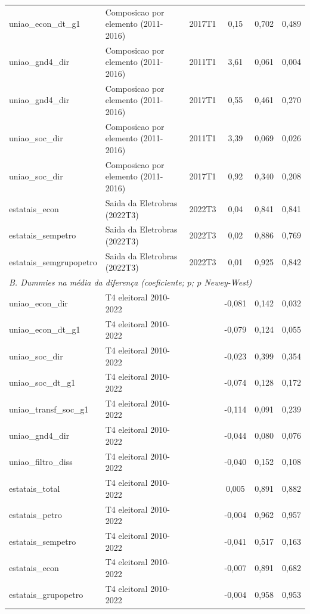 \begin{table}[htbp]
\begin{tabular}{lllccc}
uniao\_econ\_dt\_g1 & Composicao por elemento (2011-2016) & 2017T1 & 0{,}15 & 0{,}702 & 0{,}489 \\
uniao\_gnd4\_dir & Composicao por elemento (2011-2016) & 2011T1 & 3{,}61 & 0{,}061 & 0{,}004 \\
uniao\_gnd4\_dir & Composicao por elemento (2011-2016) & 2017T1 & 0{,}55 & 0{,}461 & 0{,}270 \\
uniao\_soc\_dir & Composicao por elemento (2011-2016) & 2011T1 & 3{,}39 & 0{,}069 & 0{,}026 \\
uniao\_soc\_dir & Composicao por elemento (2011-2016) & 2017T1 & 0{,}92 & 0{,}340 & 0{,}208 \\
estatais\_econ & Saida da Eletrobras (2022T3) & 2022T3 & 0{,}04 & 0{,}841 & 0{,}841 \\
estatais\_sempetro & Saida da Eletrobras (2022T3) & 2022T3 & 0{,}02 & 0{,}886 & 0{,}769 \\
estatais\_semgrupopetro & Saida da Eletrobras (2022T3) & 2022T3 & 0{,}01 & 0{,}925 & 0{,}842 \\
\midrule
\multicolumn{6}{l}{\textit{B. Dummies na m\'edia da diferen\c{c}a (coeficiente; $p$; $p$ Newey-West)}} \\
uniao\_econ\_dir & T4 eleitoral 2010-2022 & & -0{,}081 & 0{,}142 & 0{,}032 \\
uniao\_econ\_dt\_g1 & T4 eleitoral 2010-2022 & & -0{,}079 & 0{,}124 & 0{,}055 \\
uniao\_soc\_dir & T4 eleitoral 2010-2022 & & -0{,}023 & 0{,}399 & 0{,}354 \\
uniao\_soc\_dt\_g1 & T4 eleitoral 2010-2022 & & -0{,}074 & 0{,}128 & 0{,}172 \\
uniao\_transf\_soc\_g1 & T4 eleitoral 2010-2022 & & -0{,}114 & 0{,}091 & 0{,}239 \\
uniao\_gnd4\_dir & T4 eleitoral 2010-2022 & & -0{,}044 & 0{,}080 & 0{,}076 \\
uniao\_filtro\_diss & T4 eleitoral 2010-2022 & & -0{,}040 & 0{,}152 & 0{,}108 \\
estatais\_total & T4 eleitoral 2010-2022 & & 0{,}005 & 0{,}891 & 0{,}882 \\
estatais\_petro & T4 eleitoral 2010-2022 & & -0{,}004 & 0{,}962 & 0{,}957 \\
estatais\_sempetro & T4 eleitoral 2010-2022 & & -0{,}041 & 0{,}517 & 0{,}163 \\
estatais\_econ & T4 eleitoral 2010-2022 & & -0{,}007 & 0{,}891 & 0{,}682 \\
estatais\_grupopetro & T4 eleitoral 2010-2022 & & -0{,}004 & 0{,}958 & 0{,}953 \\

\end{tabular}
\end{table}
